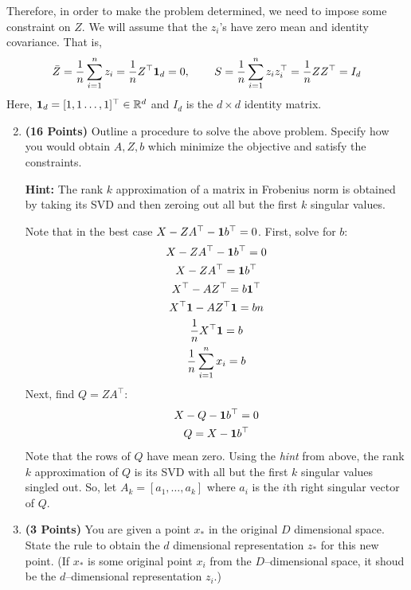 Therefore, in order to make the problem determined, we need to impose some
constraint on $Z$. We will assume that the $z_i$'s have zero mean and identity covariance.
That is,
\begin{align*}
\bar{Z} = \frac{1}{n} \sum_{i=1}^n z_i =\frac{1}{n} Z^\top {\bf 1}_d = 0, \hspace{0.3in} 
S = \frac{1}{n} \sum_{i=1}^n z_i z_i^\top 
= \frac{1}{n} Z Z^\top
= I_d
\end{align*}
Here, ${\bf 1}_d = [1, 1 \dots, 1]^\top \in\mathbb{R}^d$ and $I_d$  is the $d\times d$ identity matrix.

\begin{enumerate}
\setcounter{enumi}{1}
\item \textbf{(16 Points)}
Outline a procedure to solve the above problem. Specify how you
would obtain $A, Z, b$ which minimize the objective and satisfy the constraints.

\textbf{Hint: }The rank $k$ approximation of a matrix in Frobenius norm is obtained by
taking its SVD and then zeroing out all but the first $k$ singular values.

\begin{soln}
  Note that in the best case $X - ZA^\top - {\bf 1} b^\top = 0$.
  First, solve for $b$:
  \begin{gather*}
    X - ZA^\top - {\bf 1} b^\top = 0 \\
    X - ZA^\top = {\bf 1} b^\top \\
    X^\top - AZ^\top = b {\bf 1}^\top \\
    X^\top {\bf 1} - AZ^\top {\bf 1} = b n \\
    \frac{1}{n} X^\top {\bf 1} = b \\
    \frac{1}{n} \sum_{i=1}^{n} x_i = b 
  \end{gather*}
  Next, find $Q=ZA^\top$:
  \begin{gather*}
    X - Q - {\bf 1} b^\top = 0 \\
    Q = X - {\bf 1} b^\top
  \end{gather*}
  Note that the rows of $Q$ have mean zero.
  Using the \textit{hint} from above, the rank $k$ approximation of $Q$ is its SVD with all but the first $k$ singular values singled out.
  So, let $A_k = [a_1, \dots, a_k]$ where $a_i$ is the $i$th right singular vector of $Q$.

\end{soln}

\item \textbf{(3 Points)}
You are given a point $x_*$ in the original $D$ dimensional space.
State the rule to obtain the $d$ dimensional
representation $z_*$ for this new point.
(If $x_*$ is some original point $x_i$ from the $D$--dimensional space, it shoud be the
$d$--dimensional representation $z_i$.)


\end{enumerate}
